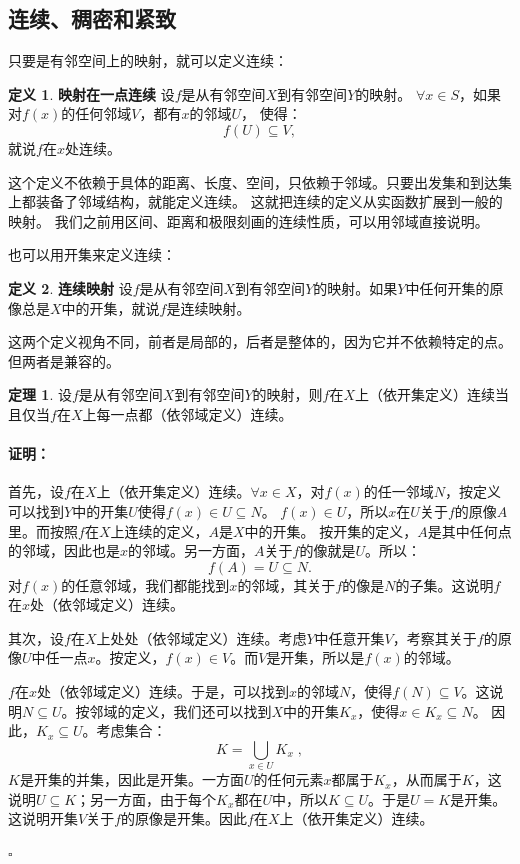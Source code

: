 \documentclass[12pt,UTF8]{ctexbook}
\theoremstyle{definition}
\newtheorem{df}{定义}[section]
\newtheorem{tm}{定理}[section]
\theoremstyle{plain}
\renewenvironment{proof}{\paragraph{\textbf{证明：}}}{\hfill$\square$}
\begin{document}
\begin{appendix}
\section{连续、稠密和紧致}

只要是有邻空间上的映射，就可以定义连续：
\begin{df}{\textbf{映射在一点连续}}
    设$f$是从有邻空间$X$到有邻空间$Y$的映射。
    $\forall x\in S$，如果对$f(x)$的任何邻域$V$，都有$x$的邻域$U$，
    使得：
    $$ f(U) \subseteq V,$$
    就说$f$在$x$处连续。
\end{df}
这个定义不依赖于具体的距离、长度、空间，只依赖于邻域。只要出发集和到达集上都装备了邻域结构，就能定义连续。
这就把连续的定义从实函数扩展到一般的映射。
我们之前用区间、距离和极限刻画的连续性质，可以用邻域直接说明。

也可以用开集来定义连续：
\begin{df}{\textbf{连续映射}}
    设$f$是从有邻空间$X$到有邻空间$Y$的映射。如果$Y$中任何开集的原像总是$X$中的开集，就说$f$是连续映射。
\end{df}

这两个定义视角不同，前者是局部的，后者是整体的，因为它并不依赖特定的点。但两者是兼容的。

\begin{tm}\label{tm:a-3-0}
    设$f$是从有邻空间$X$到有邻空间$Y$的映射，则$f$在$X$上（依开集定义）连续当且仅当$f$在$X$上每一点都（依邻域定义）连续。
\end{tm}

\begin{proof}
    首先，设$f$在$X$上（依开集定义）连续。$\forall x \in X$，对$f(x)$的任一邻域$N$，按定义可以找到$Y$中的开集$U$使得$f(x)\in U\subseteq N$。
    $f(x)\in U$，所以$x$在$U$关于$f$的原像$A$里。而按照$f$在$X$上连续的定义，$A$是$X$中的开集。
    按开集的定义，$A$是其中任何点的邻域，因此也是$x$的邻域。另一方面，$A$关于$f$的像就是$U$。所以：
    $$ f(A) = U \subseteq N. $$
    对$f(x)$的任意邻域，我们都能找到$x$的邻域，其关于$f$的像是$N$的子集。这说明$f$在$x$处（依邻域定义）连续。

    其次，设$f$在$X$上处处（依邻域定义）连续。考虑$Y$中任意开集$V$，考察其关于$f$的原像$U$中任一点$x$。按定义，$f(x)\in V$。而$V$是开集，所以是$f(x)$的邻域。
    
    $f$在$x$处（依邻域定义）连续。于是，可以找到$x$的邻域$N$，使得$f(N) \subseteq V$。这说明$N\subseteq U$。按邻域的定义，我们还可以找到$X$中的开集$K_x$，使得$x\in K_x\subseteq N$。
    因此，$K_x\subseteq U$。考虑集合：
    $$K = \bigcup_{x\in U} K_x\; ,$$
    $K$是开集的并集，因此是开集。一方面$U$的任何元素$x$都属于$K_x$，从而属于$K$，这说明$U\subseteq K$；另一方面，由于每个$K_x$都在$U$中，所以$K\subseteq U$。于是$U = K$是开集。
    这说明开集$V$关于$f$的原像是开集。因此$f$在$X$上（依开集定义）连续。


\end{proof}
\end{appendix}
\end{document}
